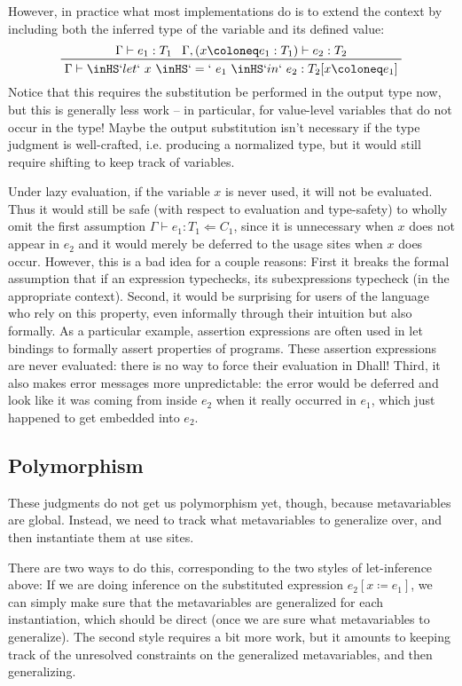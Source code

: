 \documentclass[11pt, twoside, reqno]{book}
\begin{document}
However, in practice what most implementations do is to extend the context by including both the inferred type of the variable and its defined value:
\begin{displaymath}
\prftree{\Gamma \vdash e_1 : T_1}{\Gamma, (x \coloneq e_1 : T_1) \vdash e_2 : T_2}{\Gamma \vdash \inHS`let`\ x\ \inHS`=`\ e_1\ \inHS`in`\ e_2 : T_2[x \coloneq e_1]}
\end{displaymath}
Notice that this requires the substitution be performed in the output type now, but this is generally less work -- in particular, for value-level variables that do not occur in the type!
Maybe the output substitution isn't necessary if the type judgment is well-crafted, i.e. producing a normalized type, but it would still require shifting to keep track of variables.

\begin{mdframed}[style=Note]
Under lazy evaluation, if the variable \(x\) is never used, it will not be evaluated.
Thus it would still be safe (with respect to evaluation and type-safety) to wholly omit the first assumption \(\Gamma \vdash e_1 : T_1 \Leftarrow C_1\), since it is unnecessary when \(x\) does not appear in \(e_2\) and it would merely be deferred to the usage sites when \(x\) does occur.
However, this is a bad idea for a couple reasons:
First it breaks the formal assumption that if an expression typechecks, its subexpressions typecheck (in the appropriate context).
Second, it would be surprising for users of the language who rely on this property, even informally through their intuition but also formally.
As a particular example, assertion expressions are often used in let bindings to formally assert properties of programs.
These assertion expressions are never evaluated: there is no way to force their evaluation in Dhall!
Third, it also makes error messages more unpredictable: the error would be deferred and look like it was coming from inside \(e_2\) when it really occurred in \(e_1\), which just happened to get embedded into \(e_2\).
\end{mdframed}


\subsection{Polymorphism}
These judgments do not get us polymorphism yet, though, because metavariables are global.
Instead, we need to track what metavariables to generalize over, and then instantiate them at use sites.

There are two ways to do this, corresponding to the two styles of let-inference above:
If we are doing inference on the substituted expression \(e_2[x \coloneq e_1]\), we can simply make sure that the metavariables are generalized for each instantiation, which should be direct (once we are sure what metavariables to generalize).
The second style requires a bit more work, but it amounts to keeping track of the unresolved constraints on the generalized metavariables, and then generalizing.
\end{document}
